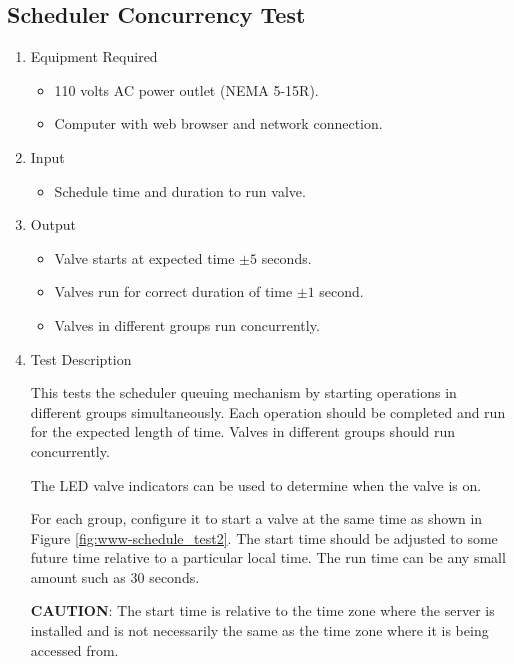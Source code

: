 \documentclass{article}
\begin{document}

\clearpage
\subsection{Scheduler Concurrency Test}

\begin{enumerate}
\item Equipment Required
	\begin{itemize}
	\item 110 volts AC power outlet (NEMA 5-15R).
	\item Computer with web browser and network connection.
	\end{itemize}
\item Input
	\begin{itemize}
	\item Schedule time and duration to run valve.
	\end{itemize}
\item Output
	\begin{itemize}
	\item Valve starts at expected time $\pm5$ seconds.
	\item Valves run for correct duration of time $\pm1$ second.
	\item Valves in different groups run concurrently.
	\end{itemize}

\item Test Description \\
\vspace{0.5em}

This tests the scheduler queuing mechanism by starting
operations in different groups simultaneously.
Each operation should be completed and run for the expected length of time.
Valves in different groups should run concurrently.

The LED valve indicators can be used to determine when the valve is on.

For each group, configure it to start a valve 
at the same time as shown in Figure \ref{fig:www-schedule_test2}.
The start time should be adjusted to some future time relative
to a particular local time.
The run time can be any small amount such as 30 seconds. \\

\begin{framed}
\textbf{CAUTION}: The start time is relative to the time zone where
the server is installed and is not necessarily the same as the
time zone where it is being accessed from.
\end{framed}


\end{enumerate}
\end{document}
